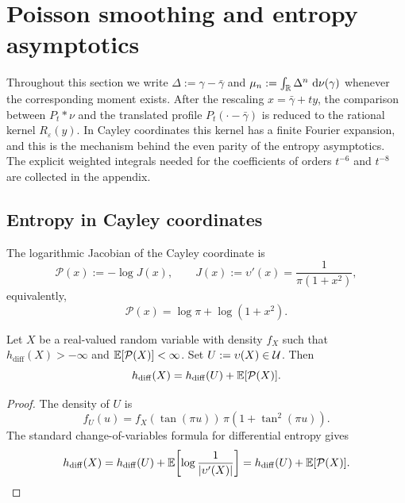 \section{Poisson smoothing and entropy asymptotics}%
\label{sec:precision-potential}\label{sec:entropy-asymptotics}

Throughout this section we write $\Delta:=\gamma-\bar\gamma$ and
$\mu_n:=\int_{\mathbb{R}}\Delta^n\,\,\mathrm{d}\nu(\gamma)$ whenever the corresponding
moment exists.  After the rescaling $x=\bar\gamma+ty$, the comparison
between $P_t*\nu$ and the translated profile $P_t(\cdot-\bar\gamma)$ is
reduced to the rational kernel $R_\varepsilon(y)$.  In Cayley
coordinates this kernel has a finite Fourier expansion, and this is the
mechanism behind the even parity of the entropy asymptotics.  The
explicit weighted integrals needed for the coefficients of orders
$t^{-6}$ and $t^{-8}$ are collected in the appendix.

\subsection{Entropy in Cayley coordinates}

The logarithmic Jacobian of the Cayley coordinate is
\begin{equation}\label{eq:precision-potential}
\mathcal P(x):=-\log J(x),\qquad
J(x):=\upsilon'(x)=\frac{1}{\pi(1+x^{2})},
\end{equation}
equivalently,
\begin{equation}\label{eq:precision-potential-expanded}
\mathcal P(x)=\log\pi+\log(1+x^{2}).
\end{equation}

\begin{proposition}%
\label{thm:precision-ledger}
Let $X$ be a real-valued random variable with density $f_X$ such that
$h_{\mathrm{diff}}(X)>-\infty$ and $\mathbb{E}[\mathcal P(X)]<\infty$.  Set
$U:=\upsilon(X)\in\mathcal{U}$.  Then
\begin{equation}\label{eq:entropy-ledger}
h_{\mathrm{diff}}(X)
=h_{\mathrm{diff}}(U)+\mathbb{E}[\mathcal P(X)].
\end{equation}
\end{proposition}

\begin{proof}
The density of $U$ is
\[
f_U(u)=f_X(\tan(\pi u))\,\pi(1+\tan^2(\pi u)).
\]
The standard change-of-variables formula for differential entropy
\cite[Chapter~9]{CoverThomas2006} gives
\[
h_{\mathrm{diff}}(X)
=h_{\mathrm{diff}}(U)+\mathbb{E}\!\left[\log\frac{1}{\lvert \upsilon'(X)\rvert}\right]
=h_{\mathrm{diff}}(U)+\mathbb{E}[\mathcal P(X)].
\]
\end{proof}

